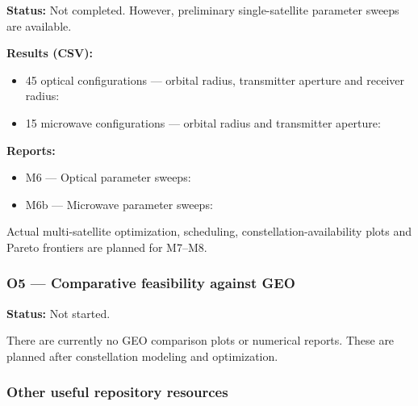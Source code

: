 \documentclass{article}
\begin{document}
\textbf{Status:} Not completed. However, preliminary single-satellite parameter sweeps are available.

\textbf{Results (CSV):}

\begin{itemize}
\item 45 optical configurations --- orbital radius, transmitter aperture and receiver radius: \href{https://github.com/extremefattypunch/Project-Dyson-Sphere/blob/helioswarm-m0-m6/figures/m6/optical_1au_sweep_summary.csv}{\textbullet}
\item 15 microwave configurations --- orbital radius and transmitter aperture: \href{https://github.com/extremefattypunch/Project-Dyson-Sphere/blob/helioswarm-m0-m6/figures/m6b/microwave_1au_sweep_summary.csv}{\textbullet}
\end{itemize}

\textbf{Reports:}

\begin{itemize}
\item M6 --- Optical parameter sweeps: \href{https://github.com/extremefattypunch/Project-Dyson-Sphere/blob/helioswarm-m0-m6/docs/milestones/M6.md}{\textbullet}
\item M6b --- Microwave parameter sweeps: \href{https://github.com/extremefattypunch/Project-Dyson-Sphere/blob/helioswarm-m0-m6/docs/milestones/M6b.md}{\textbullet}
\end{itemize}

Actual multi-satellite optimization, scheduling, constellation-availability plots and Pareto frontiers are planned for M7--M8.

\subsubsection*{O5 --- Comparative feasibility against GEO}

\textbf{Status:} Not started.

There are currently no GEO comparison plots or numerical reports. These are planned after constellation modeling and optimization.

\subsubsection*{Other useful repository resources}
\end{document}
